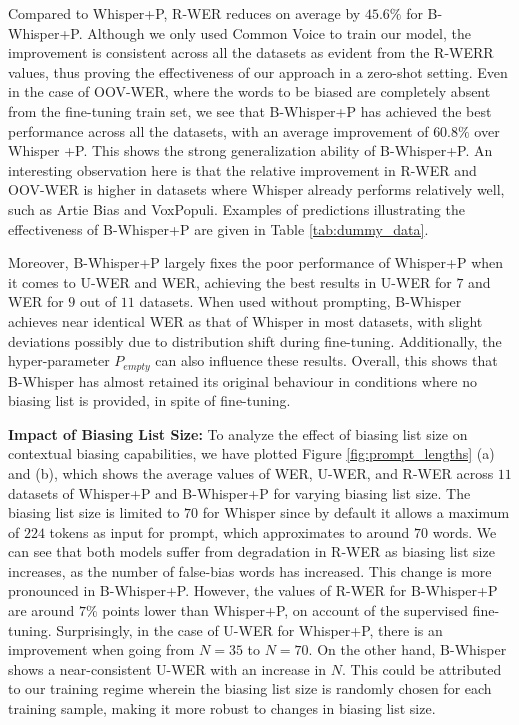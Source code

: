 \documentclass{article}
\begin{document}
Compared to Whisper+P, R-WER reduces on average by $45.6\%$ for B-Whisper+P. Although we only used Common Voice to train our model, the improvement is consistent across all the datasets as evident from the R-WERR values, thus proving the effectiveness of our approach in a zero-shot setting. Even in the case of OOV-WER, where the words to be biased are completely absent from the fine-tuning train set, we see that B-Whisper+P has achieved the best performance across all the datasets, with an average improvement of $60.8\%$ over Whisper +P. This shows the strong generalization ability of B-Whisper+P. An interesting observation here is that the relative improvement in R-WER and OOV-WER is higher in datasets where Whisper already performs relatively well, such as Artie Bias and VoxPopuli. Examples of predictions illustrating the effectiveness of B-Whisper+P are given in Table \ref{tab:dummy_data}.

Moreover, B-Whisper+P largely fixes the poor performance of Whisper+P when it comes to U-WER and WER, achieving the best results in U-WER for $7$ and WER for $9$ out of $11$ datasets. When used without prompting, B-Whisper achieves near identical WER as that of Whisper in most datasets, with slight deviations possibly due to distribution shift during fine-tuning. Additionally, the hyper-parameter $P_{empty}$ can also influence these results. Overall, this shows that B-Whisper has almost retained its original behaviour in conditions where no biasing list is provided, in spite of fine-tuning.

\textbf{Impact of Biasing List Size: } To analyze the effect of biasing list size on contextual biasing capabilities, we have plotted Figure \ref{fig:prompt_lengths} (a) and (b), which shows the average values of WER, U-WER, and R-WER across $11$ datasets of Whisper+P and B-Whisper+P for varying biasing list size. The biasing list size is limited to $70$ for Whisper since by default it allows a maximum of $224$ tokens as input for prompt, which approximates to around $70$ words.  We can see that both models suffer from degradation in R-WER as biasing list size increases, as the number of false-bias words has increased. This change is more pronounced in B-Whisper+P. However, the values of R-WER for B-Whisper+P are around $7\%$ points lower than Whisper+P, on account of the supervised fine-tuning. Surprisingly, in the case of U-WER for Whisper+P, there is an improvement when going from $N=35$ to $N=70$. On the other hand, B-Whisper shows a near-consistent U-WER with an increase in $N$. This could be attributed to our training regime wherein the biasing list size is randomly chosen for each training sample, making it more robust to changes in biasing list size. 
\end{document}
